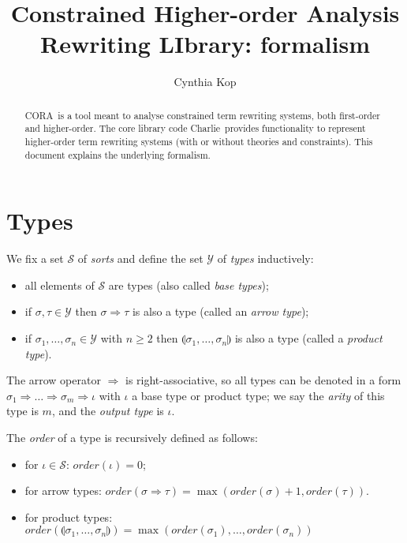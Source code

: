 \documentclass{lmcs}
\theoremstyle{theorem}\newtheorem{theorem}{Theorem}
\theoremstyle{theorem}\newtheorem{lemma}[theorem]{Lemma}
\theoremstyle{theorem}\newtheorem{corollary}[theorem]{Corollary}
\theoremstyle{definition}\newtheorem{definition}[theorem]{Definition}
\theoremstyle{definition}\newtheorem{example}[theorem]{Example}
\newcommand{\Sorts}{\mathcal{S}}
\newcommand{\Types}{\mathcal{Y}}
\newcommand{\order}{\mathit{order}}
\newcommand{\asort}{\iota}
\newcommand{\atype}{\sigma}
\newcommand{\btype}{\tau}
\newcommand{\product}[2]{\llparenthesis #1,\dots,#2 \rrparenthesis}
\newcommand{\arrtype}{\Rightarrow}
\newcommand{\cora}{\textsf{CORA}\xspace}
\newcommand{\charlie}{\textsf{Charlie}\xspace}
\begin{document}
\title{Constrained Higher-order Analysis Rewriting LIbrary: formalism}
\author{Cynthia Kop}
\address{Department of Software Science, Radboud University Nijmegen}

\maketitle

\begin{abstract}
\cora\ is a tool meant to analyse constrained term rewriting systems, both
first-order and higher-order.
The core library code \charlie\ provides functionality to represent
higher-order term rewriting systems (with or without theories and constraints).
This document explains the underlying formalism.
\end{abstract}

\section{Types}

We fix a set $\Sorts$ of \emph{sorts} and define the set $\Types$ of
\emph{types} inductively:
\begin{itemize}
\item all elements of $\Sorts$ are types (also called \emph{base types});
\item if $\atype,\btype \in \Types$ then $\atype \arrtype \btype$ is also a type
  (called an \emph{arrow type});
\item if $\atype_1,\dots,\atype_n \in \Types$ with $n \geq 2$ then
  $\product{\atype_1}{\atype_n}$ is also a type (called a \emph{product type}).
\end{itemize}
The arrow operator $\arrtype$ is right-associative, so all types can be denoted
in a form $\atype_1 \arrtype \dots \arrtype \atype_m \arrtype \asort$ with
$\asort$ a base type or product type; we say the \emph{arity} of this type is
$m$, and the \emph{output type} is $\asort$.

The \emph{order} of a type is recursively defined as follows:
\begin{itemize}
\item for $\asort \in \Sorts$: $\order(\asort) = 0$;
\item for arrow types: $\order(\atype \arrtype \btype) = \max(\order(\atype) +
  1,\order(\btype))$.
\item for product types: $\order(\product{\atype_1}{\atype_n}) =
  \max(\order(\atype_1),\dots,\order(\atype_n))$
\end{itemize}
\end{document}

